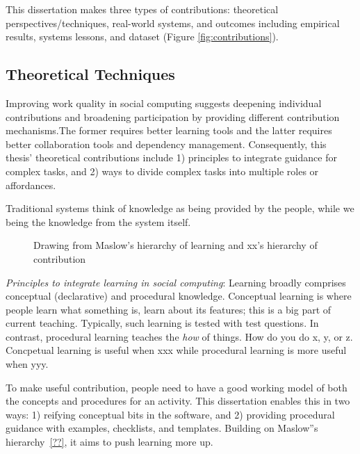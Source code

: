 This dissertation makes three types of contributions: theoretical perspectives/techniques, real-world systems, and outcomes including empirical results, systems lessons, and dataset (Figure \ref{fig:contributions}). 

\subsection{Theoretical  Techniques}
Improving  work quality in social computing suggests deepening individual contributions and broadening participation by providing different contribution mechanisms.The former requires better learning tools and the latter requires better collaboration tools and dependency management. Consequently, this thesis' theoretical contributions include 1) principles to integrate guidance for complex tasks, and 2) ways to divide complex tasks into multiple roles or affordances.


Traditional systems think of knowledge as being provided by the people, while we being the knowledge from the system itself.

\begin{figure}[b] 
  \centering
  \caption[]
{Drawing from Maslow's hierarchy of learning and xx's hierarchy of contribution}
  \label{fig:intro-taxonomy}
\end{figure}

\textit{Principles to integrate learning in social computing}: Learning broadly comprises conceptual (declarative) and procedural knowledge. Conceptual learning is where people learn what something is, learn about its features; this is a big part of current teaching. Typically, such learning is tested with test questions. In contrast, procedural learning teaches the {\it how} of things. How do you do x, y, or z.  Concpetual learning is useful when xxx while procedural learning is more useful when yyy.

To make useful contribution, people need to have a good working model of both the concepts and procedures for an activity. This dissertation enables this in two ways: 1) reifying conceptual bits in the software, and 2) providing procedural guidance with examples, checklists, and templates. Building on Maslow''s hierarchy~\ref{??}, it aims to push learning more up.

